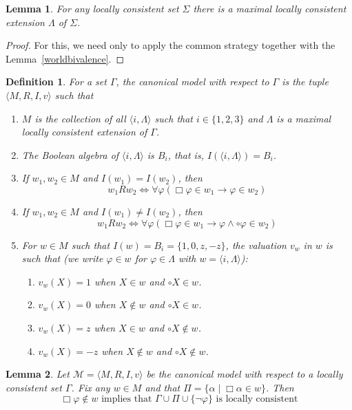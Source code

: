\documentclass{amsart}
\newtheorem{definition}{Definition}[section]
\newtheorem{lemma}{Lemma}[section]
\newcommand{\so}{\rightarrow}
\newcommand{\miff}{\Longleftrightarrow}
\newcommand{\pair}[1]{\langle #1 \rangle}
\begin{document}
\begin{lemma}
    For any locally consistent set $\Sigma$ there is a maximal locally consistent extension $\Lambda$ of $\Sigma$.
\end{lemma}

\begin{proof}
    For this, we need only to apply the common strategy together with the Lemma~\ref{worldbivalence}.
\end{proof}

\begin{definition}
    For a set $\Gamma$, the \emph{canonical model with respect to} $\Gamma$ is the tuple $\pair{M, R, I, v}$ such that
    \begin{enumerate}
        \item $M$ is the collection of all $\pair{i, \Lambda}$ such that $i \in \{1,2,3\}$ and $\Lambda$ is a maximal locally consistent extension of $\Gamma$.
        \item The Boolean algebra of $\pair{i, \Lambda}$ is $B_i$, that is, $I(\pair{i, \Lambda}) = B_i$.
        \item If $w_1, w_2 \in M$ and $I(w_1) = I(w_2)$, then 
        $$w_1 R w_2 \miff \forall \varphi (\Box \varphi \in w_1 \so \varphi \in w_2)$$
        \item If $w_1, w_2 \in M$ and $I(w_1) \neq I(w_2)$, then 
        $$w_1 R w_2 \miff \forall \varphi (\Box \varphi \in w_1 \so \varphi \land \circ \varphi \in w_2)$$
        \item For $w \in M$ such that $I(w) = B_i = \{1, 0, z, -z\}$, the valuation $v_w$ in $w$ is such that (we write $\varphi \in w$ for $\varphi \in \Lambda$ with $w = \pair{i, \Lambda}$):
        \begin{enumerate}
            \item $v_w(X) = 1$ when $X \in w$ and $\circ X \in w$.
            \item $v_w(X) = 0$ when $X \notin w$ and $\circ X \in w$.
            \item $v_w(X) = z$ when $X \in w$ and $\circ X \notin w$.
            \item $v_w(X) = -z$ when $X \notin w$ and $\circ X \notin w$.
        \end{enumerate}
    \end{enumerate}
\end{definition}

\begin{lemma}\label{boxnotin}
    Let $\mathcal{M} = \pair{M, R,I, v}$ be the canonical model with respect to a locally consistent set $\Gamma$. Fix any $w \in M$ and that $\Pi = \{\alpha \mid \Box \alpha \in w\}$. Then 
    $$\Box \varphi \notin w \text{ implies that } \Gamma \cup\Pi \cup \{\lnot \varphi\}\text{ is locally consistent}$$
\end{lemma}
\end{document}
